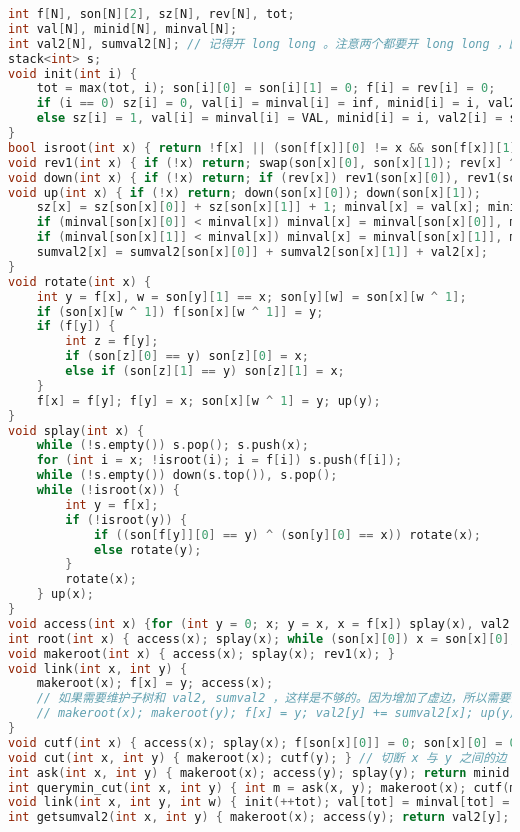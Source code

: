 \documentclass{article}
\begin{document}
\begin{lstlisting}[language=C++]
int f[N], son[N][2], sz[N], rev[N], tot;
int val[N], minid[N], minval[N];
int val2[N], sumval2[N]; // 记得开 long long 。注意两个都要开 long long ，因为 val2 还包含了虚儿子的子树和。
stack<int> s;
void init(int i) {
	tot = max(tot, i); son[i][0] = son[i][1] = 0; f[i] = rev[i] = 0;
	if (i == 0) sz[i] = 0, val[i] = minval[i] = inf, minid[i] = i, val2[i] = sumval2[i] = 0;
	else sz[i] = 1, val[i] = minval[i] = VAL, minid[i] = i, val2[i] = sumval2[i] = VAL2;
}
bool isroot(int x) { return !f[x] || (son[f[x]][0] != x && son[f[x]][1] != x); }
void rev1(int x) { if (!x) return; swap(son[x][0], son[x][1]); rev[x] ^= 1; }
void down(int x) { if (!x) return; if (rev[x]) rev1(son[x][0]), rev1(son[x][1]), rev[x] = 0; }
void up(int x) { if (!x) return; down(son[x][0]); down(son[x][1]);
	sz[x] = sz[son[x][0]] + sz[son[x][1]] + 1; minval[x] = val[x]; minid[x] = x;
	if (minval[son[x][0]] < minval[x]) minval[x] = minval[son[x][0]], minid[x] = minid[son[x][0]];
	if (minval[son[x][1]] < minval[x]) minval[x] = minval[son[x][1]], minid[x] = minid[son[x][1]];
	sumval2[x] = sumval2[son[x][0]] + sumval2[son[x][1]] + val2[x];
}
void rotate(int x) {
	int y = f[x], w = son[y][1] == x; son[y][w] = son[x][w ^ 1];
	if (son[x][w ^ 1]) f[son[x][w ^ 1]] = y;
	if (f[y]) {
		int z = f[y];
		if (son[z][0] == y) son[z][0] = x;
		else if (son[z][1] == y) son[z][1] = x;
	}
	f[x] = f[y]; f[y] = x; son[x][w ^ 1] = y; up(y);
}
void splay(int x) {
	while (!s.empty()) s.pop(); s.push(x);
	for (int i = x; !isroot(i); i = f[i]) s.push(f[i]);
	while (!s.empty()) down(s.top()), s.pop();
	while (!isroot(x)) {
		int y = f[x];
		if (!isroot(y)) {
			if ((son[f[y]][0] == y) ^ (son[y][0] == x)) rotate(x);
			else rotate(y);
		}
		rotate(x);
	} up(x);
}
void access(int x) {for (int y = 0; x; y = x, x = f[x]) splay(x), val2[x] += sumval2[son[x][1]], son[x][1] = y, val2[x] -= sumval2[son[x][1]], up(x); }
int root(int x) { access(x); splay(x); while (son[x][0]) x = son[x][0]; return x; }
void makeroot(int x) { access(x); splay(x); rev1(x); }
void link(int x, int y) {
	makeroot(x); f[x] = y; access(x);
	// 如果需要维护子树和 val2, sumval2 ，这样是不够的。因为增加了虚边，所以需要修改 val2 值。将上面的代码替换为以下代码：
	// makeroot(x); makeroot(y); f[x] = y; val2[y] += sumval2[x]; up(y); access(x);
}
void cutf(int x) { access(x); splay(x); f[son[x][0]] = 0; son[x][0] = 0; up(x); } // 它和父亲的边
void cut(int x, int y) { makeroot(x); cutf(y); } // 切断 x 与 y 之间的边（须保证 x 与 y 相邻）
int ask(int x, int y) { makeroot(x); access(y); splay(y); return minid[y]; } // 询问 x 到 y 之间取得最小值的点
int querymin_cut(int x, int y) { int m = ask(x, y); makeroot(x); cutf(m); makeroot(y); cutf(m); return val[m]; } // 询问 x 到 y 之间取得最小值的点，并把它删去（须保证该点在 x 和 y 之间，且度数恰好为 2）
void link(int x, int y, int w) { init(++tot); val[tot] = minval[tot] = w; link(x, tot); link(y, tot); } // 在 x 和 y 之间添加一条权值为 w 的边（将边视为点插入）
int getsumval2(int x, int y) { makeroot(x); access(y); return val2[y]; } // 令 x 为根，求 y 子树的 val2 的和
\end{lstlisting}
\end{document}

